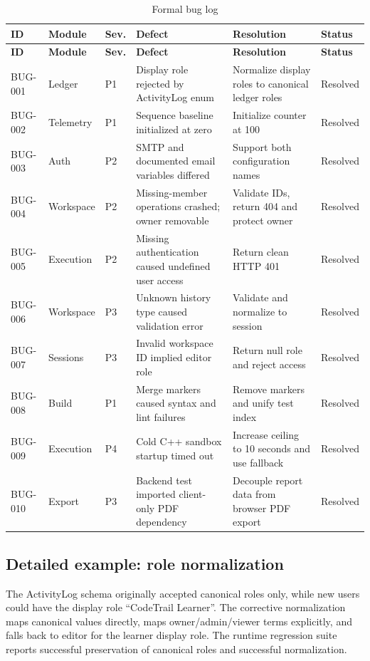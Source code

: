 \documentclass[11pt,a4paper]{article}
\newcommand{\tableheader}[1]{\textbf{#1}}
\begin{document}
\scriptsize
\begin{xltabular}{\textwidth}{L{0.9cm} L{1.5cm} C{0.8cm} Y Y C{1.2cm}}
\caption{Formal bug log}\label{tab:bugs}\\
\toprule
{}
\tableheader{ID} & \tableheader{Module} & \tableheader{Sev.} & \tableheader{Defect} & \tableheader{Resolution} & \tableheader{Status}\\
\midrule
\endfirsthead
\toprule
{}
\tableheader{ID} & \tableheader{Module} & \tableheader{Sev.} & \tableheader{Defect} & \tableheader{Resolution} & \tableheader{Status}\\
\midrule
\endhead
BUG-001 & Ledger & P1 & Display role rejected by ActivityLog enum & Normalize display roles to canonical ledger roles & Resolved\\
BUG-002 & Telemetry & P1 & Sequence baseline initialized at zero & Initialize counter at 100 & Resolved\\
BUG-003 & Auth & P2 & SMTP and documented email variables differed & Support both configuration names & Resolved\\
BUG-004 & Workspace & P2 & Missing-member operations crashed; owner removable & Validate IDs, return 404 and protect owner & Resolved\\
BUG-005 & Execution & P2 & Missing authentication caused undefined user access & Return clean HTTP 401 & Resolved\\
BUG-006 & Workspace & P3 & Unknown history type caused validation error & Validate and normalize to session & Resolved\\
BUG-007 & Sessions & P3 & Invalid workspace ID implied editor role & Return null role and reject access & Resolved\\
BUG-008 & Build & P1 & Merge markers caused syntax and lint failures & Remove markers and unify test index & Resolved\\
BUG-009 & Execution & P4 & Cold C++ sandbox startup timed out & Increase ceiling to 10 seconds and use fallback & Resolved\\
BUG-010 & Export & P3 & Backend test imported client-only PDF dependency & Decouple report data from browser PDF export & Resolved\\
\bottomrule
\end{xltabular}
\normalsize

\subsection{Detailed example: role normalization}
The ActivityLog schema originally accepted canonical roles only, while new users
could have the display role ``CodeTrail Learner''. The corrective normalization
maps canonical values directly, maps owner/admin/viewer terms explicitly, and
falls back to editor for the learner display role. The runtime regression suite
reports successful preservation of canonical roles and successful normalization.
\end{document}
